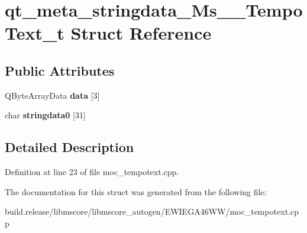\hypertarget{structqt__meta__stringdata___ms_____tempo_text__t}{}\section{qt\+\_\+meta\+\_\+stringdata\+\_\+\+Ms\+\_\+\+\_\+\+Tempo\+Text\+\_\+t Struct Reference}
\label{structqt__meta__stringdata___ms_____tempo_text__t}
\subsection*{Public Attributes}
\begin{DoxyCompactItemize}
\item 
\mbox{\label{structqt__meta__stringdata___ms_____tempo_text__t_a0202e439a13048037967e500f4299a24}} 
Q\+Byte\+Array\+Data {\bfseries data} \mbox{[}3\mbox{]}
\item 
\mbox{\label{structqt__meta__stringdata___ms_____tempo_text__t_a75fe537f40d0b155a46654138f8ceafe}} 
char {\bfseries stringdata0} \mbox{[}31\mbox{]}
\end{DoxyCompactItemize}


\subsection{Detailed Description}


Definition at line 23 of file moc\+\_\+tempotext.\+cpp.



The documentation for this struct was generated from the following file\+:\begin{DoxyCompactItemize}
\item 
build.\+release/libmscore/libmscore\+\_\+autogen/\+E\+W\+I\+E\+G\+A46\+W\+W/moc\+\_\+tempotext.\+cpp\end{DoxyCompactItemize}
